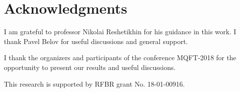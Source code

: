 \documentclass{article}
\begin{document}
\section*{Acknowledgments}
\label{sec:acknowledgements}
I am grateful to professor Nikolai Reshetikhin for his guidance in this work. I thank Pavel Belov
for useful discussions and general support.

I thank the organizers and participants of the conference MQFT-2018 for the opportunity
to present our results and useful discussions.

This research is supported by RFBR grant No. 18-01-00916.


{} 
\end{document}
